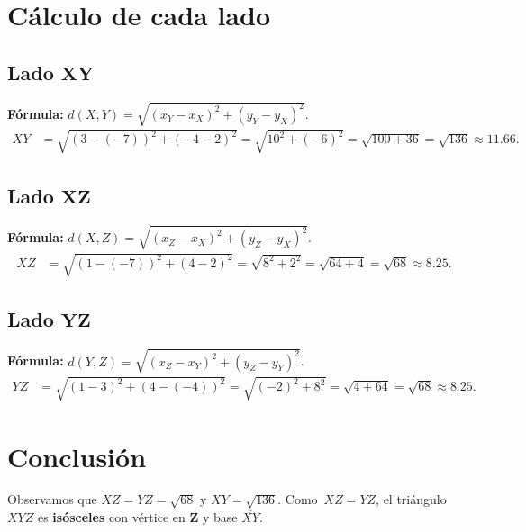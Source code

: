\documentclass[12pt,a4paper]{article}
\begin{document}
			\section*{Cálculo de cada lado}
			\subsection*{Lado \(\mathbf{XY}\)}
			\textbf{Fórmula:}
			\(d(X,Y)=\sqrt{(x_Y-x_X)^2+(y_Y-y_X)^2}\).
			\[
			\begin{aligned}
				XY &= \sqrt{(3-(-7))^2+(-4-2)^2}
				= \sqrt{10^2+(-6)^2}
				= \sqrt{100+36}
				= \sqrt{136}\approx 11.66.
			\end{aligned}
			\]
			
			\subsection*{Lado \(\mathbf{XZ}\)}
			\textbf{Fórmula:}
			\(d(X,Z)=\sqrt{(x_Z-x_X)^2+(y_Z-y_X)^2}\).
			\[
			\begin{aligned}
				XZ &= \sqrt{(1-(-7))^2+(4-2)^2}
				= \sqrt{8^2+2^2}
				= \sqrt{64+4}
				= \sqrt{68}\approx 8.25.
			\end{aligned}
			\]
			
			\subsection*{Lado \(\mathbf{YZ}\)}
			\textbf{Fórmula:}
			\(d(Y,Z)=\sqrt{(x_Z-x_Y)^2+(y_Z-y_Y)^2}\).
			\[
			\begin{aligned}
				YZ &= \sqrt{(1-3)^2+(4-(-4))^2}
				= \sqrt{(-2)^2+8^2}
				= \sqrt{4+64}
				= \sqrt{68}\approx 8.25.
			\end{aligned}
			\]
			
			\section*{Conclusión}
			Observamos que \(XZ = YZ = \sqrt{68}\) y \(XY=\sqrt{136}\).
			Como \(\,XZ=YZ\), el triángulo \(XYZ\) es \textbf{isósceles} con vértice en \(\mathbf{Z}\) y base \(\overline{XY}\).
			
\end{document}
